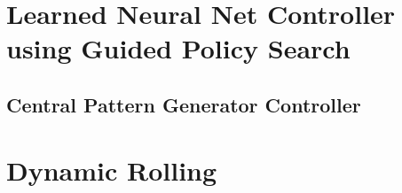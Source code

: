 \section{Learned Neural Net Controller using Guided Policy Search}
\label{learned_controllers}


\subsection{Central Pattern Generator Controller}
\label{cpg_controller}

\section{Dynamic Rolling}
\label{dyncamic_rolling}